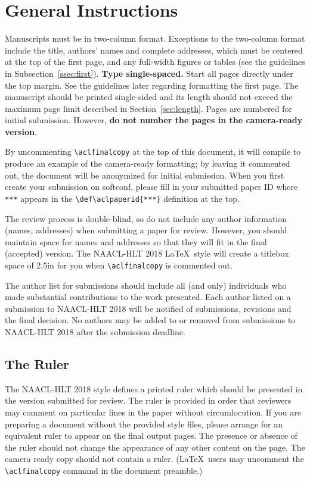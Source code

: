 \documentclass[11pt,a4paper]{article}
\begin{document}
\section{General Instructions}

Manuscripts must be in two-column format.  Exceptions to the
two-column format include the title, authors' names and complete
addresses, which must be centered at the top of the first page, and
any full-width figures or tables (see the guidelines in
Subsection~\ref{ssec:first}). {\bf Type single-spaced.}  Start all
pages directly under the top margin. See the guidelines later
regarding formatting the first page.  The manuscript should be
printed single-sided and its length
should not exceed the maximum page limit described in Section~\ref{sec:length}.
Pages are numbered for  initial submission. However, {\bf do not number the pages in the camera-ready version}.

By uncommenting {\small\verb|\aclfinalcopy|} at the top of this 
 document, it will compile to produce an example of the camera-ready formatting; by leaving it commented out, the document will be anonymized for initial submission.  When you first create your submission on softconf, please fill in your submitted paper ID where {\small\verb|***|} appears in the {\small\verb|\def\aclpaperid{***}|} definition at the top.

The review process is double-blind, so do not include any author information (names, addresses) when submitting a paper for review.  
However, you should maintain space for names and addresses so that they will fit in the final (accepted) version.  The NAACL-HLT 2018 \LaTeX\ style will create a titlebox space of 2.5in for you when {\small\verb|\aclfinalcopy|} is commented out.  

The author list for submissions should include all (and only) individuals who made substantial contributions to the work presented. Each author listed on a submission to NAACL-HLT 2018 will be notified of submissions, revisions and the final decision. No authors may be added to or removed from submissions to NAACL-HLT 2018 after the submission deadline.

\subsection{The Ruler}
The NAACL-HLT 2018 style defines a printed ruler which should be presented in the
version submitted for review.  The ruler is provided in order that
reviewers may comment on particular lines in the paper without
circumlocution.  If you are preparing a document without the provided
style files, please arrange for an equivalent ruler to
appear on the final output pages.  The presence or absence of the ruler
should not change the appearance of any other content on the page.  The
camera ready copy should not contain a ruler. (\LaTeX\ users may uncomment the {\small\verb|\aclfinalcopy|} command in the document preamble.)  
\end{document}
